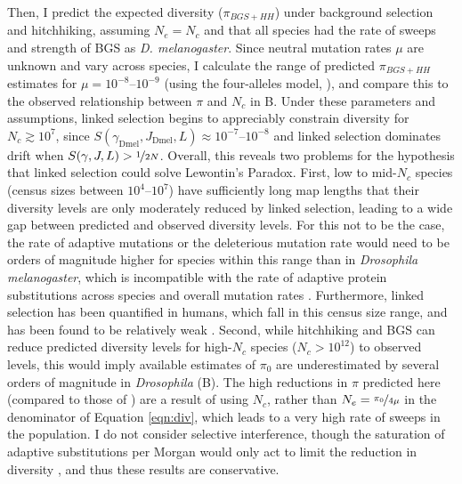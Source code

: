 \documentclass[9pt,lineno]{elife}
\begin{document}
Then, I predict the expected diversity ($\pi_{BGS+HH}$) under background
selection and hitchhiking, assuming $N_e= N_c$ and that all species had the
rate of sweeps and strength of BGS as \emph{D. melanogaster}. Since neutral
mutation rates $\mu$ are unknown and vary across species, I calculate the range
of predicted $\pi_{BGS+HH}$ estimates for $\mu = 10^{-8}$--$10^{-9}$ (using the
four-alleles model, \cite{Tajima1996-rb}), and compare this to the observed
relationship between $\pi$ and $N_c$ in B.  Under these parameters
and assumptions, linked selection begins to appreciably constrain diversity for
$N_c \gtrsim 10^7$, since $S(\gamma_\text{Dmel}, J_\text{Dmel}, L) \approx
10^{-7}$--$10^{-8}$ and linked selection dominates drift when $S(\gamma, J, L)
> \nicefrac{1}{2N}$. Overall, this reveals two problems for the hypothesis that
linked selection could solve Lewontin's Paradox. First, low to mid-$N_c$
species (census sizes between $10^{4}$--$10^{7}$) have sufficiently long map
lengths that their diversity levels are only moderately reduced by linked
selection, leading to a wide gap between predicted and observed diversity
levels. For this not to be the case, the rate of adaptive mutations or the
deleterious mutation rate would need to be orders of magnitude higher for
species within this range than in \emph{Drosophila melanogaster}, which is
incompatible with the rate of adaptive protein substitutions across species
\citep{Galtier2016-dq} and overall mutation rates \citep{Lynch2010-ki}.
Furthermore, linked selection has been quantified in humans, which fall in this
census size range, and has been found to be relatively weak
\citep{McVicker2009-ax,Hernandez2011-gs,Hellmann2008-ic,Cai2009-by,Boyko2008-tj}.
Second, while hitchhiking and BGS can reduce predicted diversity levels for
high-$N_c$ species ($N_c > 10^{12}$) to observed levels, this would imply
available estimates of $\pi_0$ are underestimated by several orders of
magnitude in \emph{Drosophila} (B). The high
reductions in $\pi$ predicted here (compared to those of
\cite{Elyashiv2016-vt}) are a result of using $N_c$, rather than $N_e =
\nicefrac{\pi_0}{4 \mu}$ in the denominator of Equation \eqref{eqn:div}, which
leads to a very high rate of sweeps in the population. I do not consider
selective interference, though the saturation of adaptive substitutions per
Morgan would only act to limit the reduction in diversity
\citep{Weissman2012-aa}, and thus these results are conservative.  
\end{document}
